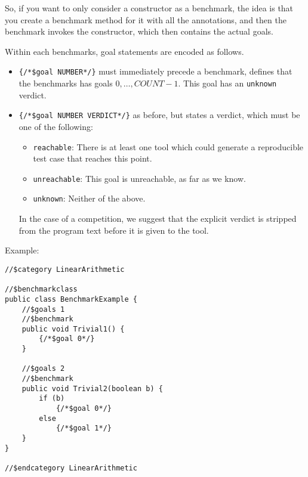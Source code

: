 So, if you want to only consider a constructor as a benchmark, the idea is that you create a benchmark method for it with all the annotations, and then the benchmark invokes the constructor, which then contains the actual goals.

Within each benchmarks, goal statements are encoded as follows.
\begin{itemize}
\item {\tt \{/*\$goal NUMBER*/\}} must immediately precede a benchmark, defines that the benchmarks has goals $0, \ldots, COUNT-1$. 
This goal has an {\tt unknown} verdict.
\item {\tt \{/*\$goal NUMBER VERDICT*/\}} as before, but states a verdict, which must be one of the following:
\begin{itemize}
\item {\tt reachable}: There is at least one tool which could generate a reproducible test case that reaches this point.
\item {\tt unreachable}: This goal is unreachable, as far as we know.
\item {\tt unknown}: Neither of the above.
\end{itemize}
In the case of a competition, we suggest that the explicit verdict is stripped
from the program text before it is given to the tool.
\end{itemize}

Example:
\begin{verbatim}
//$category LinearArithmetic

//$benchmarkclass
public class BenchmarkExample {
    //$goals 1
    //$benchmark
    public void Trivial1() {
        {/*$goal 0*/}        
    }

    //$goals 2
    //$benchmark
    public void Trivial2(boolean b) {
        if (b)
            {/*$goal 0*/}        
        else
            {/*$goal 1*/}        
    }
}

//$endcategory LinearArithmetic
\end{verbatim}

